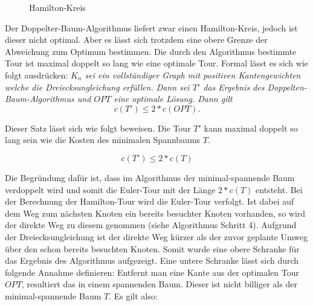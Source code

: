 \documentclass{article}
\begin{document}
\begin{figure}[H]
\centering
{}
\caption{Hamilton-Kreis}
\label{fig:ursprungs-graf-hamiltonkreis}
\end{figure}

Der Doppelter-Baum-Algorithmus liefert zwar einen Hamilton-Kreis, jedoch ist dieser nicht optimal. Aber es lässt sich trotzdem eine obere Grenze der Abweichung zum Optimum bestimmen. Die durch den Algorithmus bestimmte Tour ist maximal doppelt so lang wie eine optimale Tour. Formal lässt es sich wie folgt ausdrücken:
\textit{$K_n$ sei ein vollständiger Graph mit positiven Kantengewichten welche die Dreiecksungleichung erfüllen. Dann sei $T'$ das Ergebnis des Doppelten-Baum-Algorithmus und $OPT$ eine optimale Lösung. Dann gilt
\begin{equation}
c(T') \leq 2 * c(OPT).
\label{eq:test}
\end{equation}}

Dieser Satz lässt sich wie folgt beweisen. Die Tour $T'$ kann maximal doppelt so lang sein wie die Kosten des minimalen Spannbaums $T$.

\begin{equation}
c(T') \leq 2 * c(T)
\end{equation}

Die Begründung dafür ist, dass im Algorithmus der minimal-spannende Baum verdoppelt wird und somit die Euler-Tour mit der Länge $2 * c(T)$ entsteht. Bei der Berechnung der Hamilton-Tour wird die Euler-Tour verfolgt. Ist dabei auf dem Weg zum nächsten Knoten ein bereits besuchter Knoten vorhanden, so wird der direkte Weg zu diesem genommen (siehe Algorithmus Schritt 4). Aufgrund der Dreiecksungleichung ist der direkte Weg kürzer als der zuvor geplante Umweg über den schon bereits besuchten Knoten. Somit wurde eine obere Schranke für das Ergebnis des Algorithmus aufgezeigt. Eine untere Schranke lässt sich durch folgende Annahme definieren: Entfernt man eine Kante aus der optimalen Tour $OPT$, resultiert das in einem spannenden Baum. Dieser ist nicht billiger als der minimal-spannende Baum $T$. Es gilt also:
\end{document}
